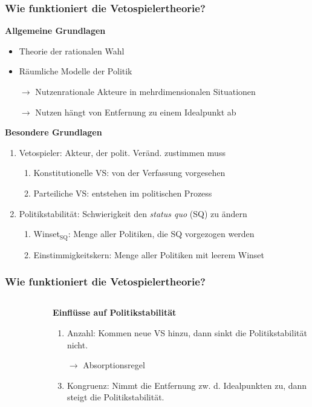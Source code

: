 \documentclass{beamer}
\begin{document}
\begin{frame}
\frametitle{Wie funktioniert die Vetospielertheorie?}
\textbf{Allgemeine Grundlagen}
\begin{itemize}
  \item Theorie der rationalen Wahl
  \item Räumliche Modelle der Politik
  \item [$\rightarrow$] Nutzenrationale Akteure in mehrdimensionalen Situationen
  \item [$\rightarrow$] Nutzen hängt von Entfernung zu einem Idealpunkt ab
\end{itemize}
\vfill

\textbf{Besondere Grundlagen}
\begin{enumerate}
  \item Vetospieler: Akteur, der polit. Veränd. zustimmen muss
  \begin{enumerate}
    \item Konstitutionelle VS: von der Verfassung vorgesehen
    \item Parteiliche VS: entstehen im politischen Prozess
  \end{enumerate}
  \item Politikstabilität: Schwierigkeit den \textit{status quo} (SQ) zu ändern
  \begin{enumerate}
    \item Winset$_{\text{SQ}}$: Menge aller Politiken, die SQ vorgezogen werden
    \item Einstimmigkeitskern: Menge aller Politiken mit leerem Winset
  \end{enumerate}
\end{enumerate}
\end{frame}

\begin{frame}
\frametitle{Wie funktioniert die Vetospielertheorie?}
\begin{columns}
  \begin{column}{.5\textwidth}
  \begin{figure}
    \centering
    
  \end{figure}
  \end{column}
  \begin{column}{.5\textwidth}
  \textbf{Einflüsse auf Politikstabilität}
  \begin{enumerate}
    \item Anzahl: Kommen neue VS hinzu, dann sinkt die Politikstabilität nicht.
    \item [$\rightarrow$] Absorptionsregel
    \item Kongruenz: Nimmt die Entfernung zw. d. Idealpunkten zu, dann steigt die Politikstabilität.
  \end{enumerate}
  \end{column}
\end{columns}
\end{frame}
\end{document}
